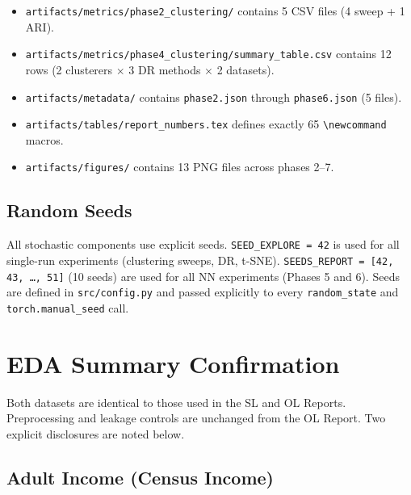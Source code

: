\documentclass[letterpaper, 11pt]{article}
\begin{document}
\begin{itemize}
\item \texttt{artifacts/metrics/phase2\_clustering/} contains 5 CSV files (4 sweep + 1 ARI).
\item \texttt{artifacts/metrics/phase4\_clustering/summary\_table.csv} contains 12 rows (2 clusterers $\times$ 3 DR methods $\times$ 2 datasets).
\item \texttt{artifacts/metadata/} contains \texttt{phase2.json} through \texttt{phase6.json} (5 files).
\item \texttt{artifacts/tables/report\_numbers.tex} defines exactly 65 \texttt{\textbackslash newcommand} macros.
\item \texttt{artifacts/figures/} contains 13 PNG files across phases 2--7.
\end{itemize}

\subsection{Random Seeds}

All stochastic components use explicit seeds.
\texttt{SEED\_EXPLORE = 42} is used for all single-run experiments (clustering sweeps, DR, t-SNE).
\texttt{SEEDS\_REPORT = [42, 43, \ldots, 51]} (10 seeds) are used for all NN experiments (Phases 5 and 6).
Seeds are defined in \texttt{src/config.py} and passed explicitly to every \texttt{random\_state} and \texttt{torch.manual\_seed} call.

\section{EDA Summary Confirmation}

Both datasets are identical to those used in the SL and OL Reports. Preprocessing and leakage controls are unchanged from the OL Report. Two explicit disclosures are noted below.

\subsection{Adult Income (Census Income)}
\end{document}
